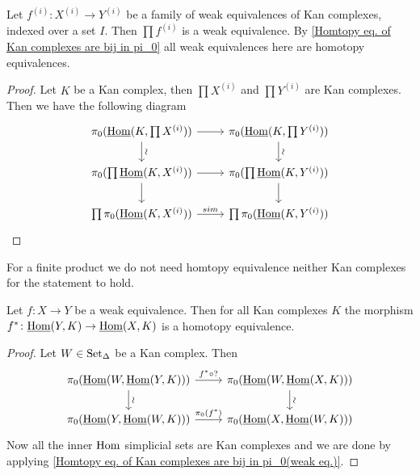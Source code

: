 \begin{prop}
    Let $f^{(i)}\colon X^{(i)} \to Y^{(i)}$ be a family of weak equivalences of Kan complexes, indexed over a set $I$.
    Then $\prod f^{(i)}$ is a weak equivalence.
    By \cref{Homtopy eq. of Kan complexes are bij in pi_0} all weak equivalences here are homotopy equivalences.
\end{prop}

\begin{proof}
    Let $K$ be a Kan complex, then $\prod X^{(i)}$ and $\prod Y^{(i)}$ are Kan complexes.
    Then we have the following diagram
    \[
    \begin{tikzcd}
        \pi_0(\underline{\Hom}(K, \prod X^{(i)}))
        \rar
        \ar[d,sloped, auto= false, "\sim"]
        &
        \pi_0(\underline{\Hom}(K, \prod Y^{(i)}))
        \ar[d,sloped, auto= false, "\sim"]
        \\
        \pi_0(\prod \underline{\Hom}(K, X^{(i)}))
        \rar
        \dar
        &
        \pi_0(\prod \underline{\Hom}(K, Y^{(i)}))
        \dar
        \\
        \prod \pi_0(\underline{\Hom}(K, X^{(i)}))
        \ar[r, "sim"]
        &
        \prod \pi_0(\underline{\Hom}(K, Y^{(i)}))
    \end{tikzcd}
    \]
\end{proof}

\begin{rmk}
    For a finite product we do not need homtopy equivalence neither Kan complexes for the statement to hold.
\end{rmk}

\begin{prop}
    Let $f\colon X \to Y$ be a weak equivalence.
    Then for all Kan complexes $K$ the morphism $f^*\colon \underline{\operatorname{Hom}}(Y,K) \to \underline{\operatorname{Hom}}(X,K)$ is a homotopy equivalence.
\end{prop}

\begin{proof}
    Let $ W \in \operatorname{Set}_{\Delta}$ be a Kan complex.
    Then
    \[
    \begin{tikzcd}
        \pi_0(\underline{\Hom}(W, \underline{\Hom}(Y,K)))
        \ar[r, "f^* \circ ?"]
        \ar[d,sloped, auto= false, "\sim"]
        &
        \pi_0(\underline{\Hom}(W, \underline{\Hom}(X,K)))
        \ar[d,sloped, auto= false, "\sim"]
        \\
        \pi_0(\underline{\Hom}(Y, \underline{\Hom}(W,K)))
        \ar[r, "\pi_0(f^*)"]
        &
        \pi_0(\underline{\Hom}(X, \underline{\Hom}(W,K)))
    \end{tikzcd}
    \]
    Now all the inner $\operatorname{Hom}$ simplicial sets are Kan complexes and we are done by applying \cref{Homtopy eq. of Kan complexes are bij in pi_0(weak eq.)}.
\end{proof}


